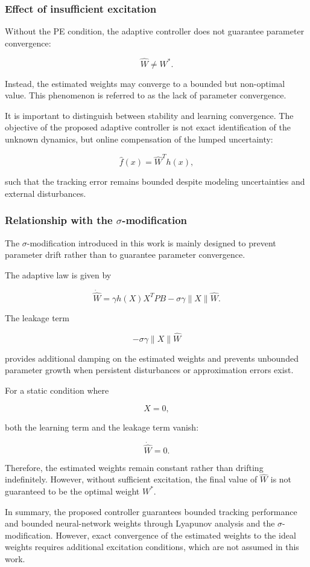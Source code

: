 \subsubsection{Effect of insufficient excitation}

Without the PE condition, the adaptive controller does not guarantee parameter convergence:

\[
\hat W\neq W^{*}.
\]

Instead, the estimated weights may converge to a bounded but non-optimal value. This phenomenon is referred to as the lack of parameter convergence.

It is important to distinguish between stability and learning convergence. The objective of the proposed adaptive controller is not exact identification of the unknown dynamics, but online compensation of the lumped uncertainty:

\[
\hat f(x)=\hat W^{T}h(x),
\]

such that the tracking error remains bounded despite modeling uncertainties and external disturbances.


\subsubsection{Relationship with the $\sigma$-modification}

The $\sigma$-modification introduced in this work is mainly designed to prevent parameter drift rather than to guarantee parameter convergence.

The adaptive law is given by

\[
\dot{\hat W}
=
\gamma h(X)X^{T}PB
-
\sigma\gamma\|X\|\hat W .
\]

The leakage term

\[
-\sigma\gamma\|X\|\hat W
\]

provides additional damping on the estimated weights and prevents unbounded parameter growth when persistent disturbances or approximation errors exist.

For a static condition where

\[
X=0,
\]

both the learning term and the leakage term vanish:

\[
\dot{\hat W}=0.
\]

Therefore, the estimated weights remain constant rather than drifting indefinitely. However, without sufficient excitation, the final value of $\hat W$ is not guaranteed to be the optimal weight $W^*$.

In summary, the proposed controller guarantees bounded tracking performance and bounded neural-network weights through Lyapunov analysis and the $\sigma$-modification. However, exact convergence of the estimated weights to the ideal weights requires additional excitation conditions, which are not assumed in this work.